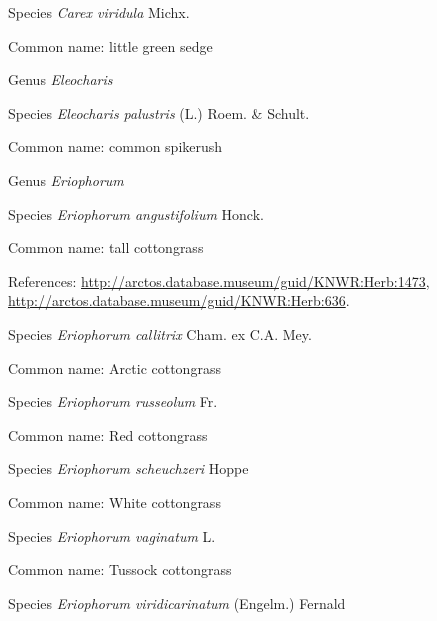 \documentclass[9pt, article]{memoir}
\begin{document}
\begin{multicols}{2}
\vspace{6pt}\noindent\hspace{36pt}Species \textit{Carex viridula} Michx.


Common name: little green sedge

\vspace{6pt}\noindent\hspace{30pt}Genus \textit{Eleocharis}


\vspace{6pt}\noindent\hspace{36pt}Species \textit{Eleocharis palustris} (L.) Roem. \& Schult.


Common name: common spikerush

\vspace{6pt}\noindent\hspace{30pt}Genus \textit{Eriophorum}


\vspace{6pt}\noindent\hspace{36pt}Species \textit{Eriophorum angustifolium} Honck.


Common name: tall cottongrass

References: 
\url{http://arctos.database.museum/guid/KNWR:Herb:1473}, 
\url{http://arctos.database.museum/guid/KNWR:Herb:636}.

\vspace{6pt}\noindent\hspace{36pt}Species \textit{Eriophorum callitrix} Cham. ex C.A. Mey.


Common name: Arctic cottongrass

\vspace{6pt}\noindent\hspace{36pt}Species \textit{Eriophorum russeolum} Fr.


Common name: Red cottongrass

\vspace{6pt}\noindent\hspace{36pt}Species \textit{Eriophorum scheuchzeri} Hoppe


Common name: White cottongrass

\vspace{6pt}\noindent\hspace{36pt}Species \textit{Eriophorum vaginatum} L.


Common name: Tussock cottongrass

\vspace{6pt}\noindent\hspace{36pt}Species \textit{Eriophorum viridicarinatum} (Engelm.) Fernald



\end{multicols}
\end{document}
